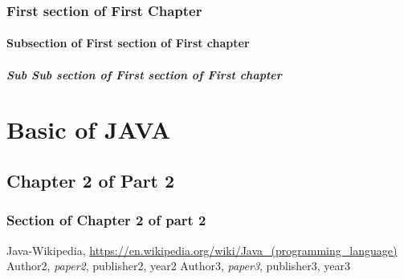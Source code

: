 \documentclass[A4 paper,openany]{book}  %
\begin{document}
\section{First section of First Chapter}
\subsection{Subsection of First section of First chapter}
\subsubsection{Sub Sub section of First section of First chapter}

\part{Basic of JAVA}
\chapter{Chapter 2 of Part 2}
\section{Section of Chapter 2 of part 2}


\printindex

\begin{thebibliography}{90}
     Java-Wikipedia, \url{https://en.wikipedia.org/wiki/Java_(programming_language)}
     Author2, \textit{paper2}, publisher2, year2
     Author3, \textit{paper3}, publisher3, year3
\end{thebibliography}
\end{document}
